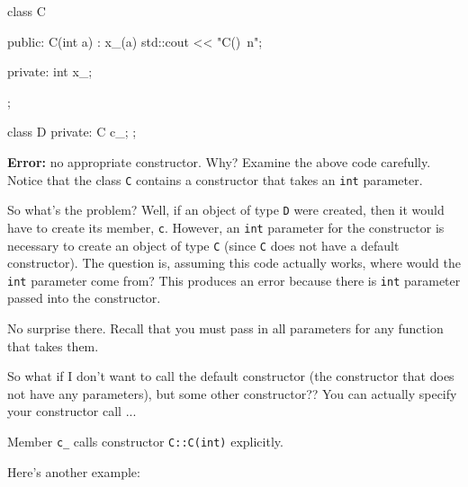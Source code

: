 \begin{console}
class C
{
public:
        C(int a)
              : x_(a)
        {
              std::cout << "C()\ n";
        }
        
private:
        int x_;
};

class D
{
private:
        C c_;
};
\end{console}

\textbf{Error:} no appropriate constructor. Why? Examine the above code
carefully. Notice that the class \texttt{C} contains a constructor that
takes an \texttt{int} parameter.

So what's the problem? Well, if an object of type
\texttt{D} were created, then it would have to create its member,
\texttt{c}. However, an \texttt{int} parameter for the constructor is
necessary to create an object of type \texttt{C} (since \texttt{C} does not
have a default constructor). The question is, assuming this code
actually works, where would the \texttt{int} parameter come from? This
produces an error because there is  \texttt{int} parameter
passed into the constructor.

No surprise there. Recall that you must pass in all parameters for any
function that takes them.

\newpage{}

So what if I don't want to call the default constructor (the constructor that does not have any parameters), but some other constructor?? You can actually specify your constructor call ...


Member \texttt{c\_} calls constructor \texttt{C::C(int)} explicitly.

Here's another example:


